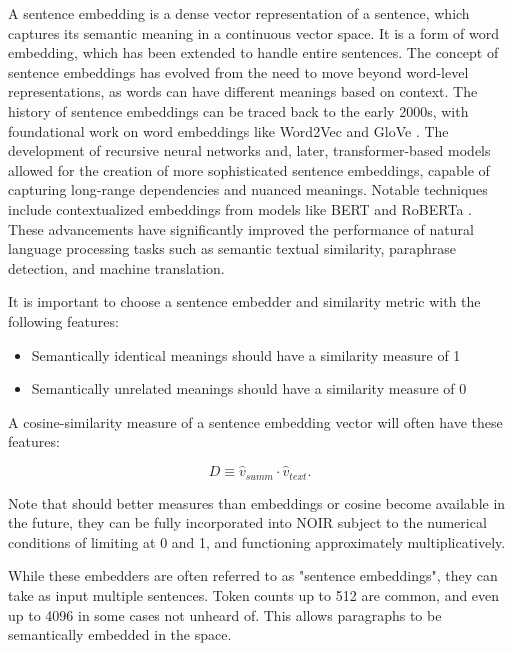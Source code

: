 \documentclass{article}
\begin{document}
A sentence embedding is a dense vector representation of a sentence, which captures its semantic meaning in a continuous vector space. It is a form of word embedding, which has been extended to handle entire sentences. The concept of sentence embeddings has evolved from the need to move beyond word-level representations, as words can have different meanings based on context. The history of sentence embeddings can be traced back to the early 2000s, with foundational work on word embeddings like Word2Vec \citep{mikolov2013efficient} and GloVe \citep{pennington-etal-2014-glove,}. The development of recursive neural networks and, later, transformer-based models allowed for the creation of more sophisticated sentence embeddings, capable of capturing long-range dependencies and nuanced meanings. Notable techniques include contextualized embeddings from models like BERT \citep{DBLP:journals/corr/abs-1810-04805} and RoBERTa \citep{DBLP:journals/corr/abs-1907-11692}. These advancements have significantly improved the performance of natural language processing tasks such as semantic textual similarity, paraphrase detection, and machine translation.

It is important to choose a sentence embedder and similarity metric with the following features: 

\begin{itemize}
	\item Semantically identical meanings should have a similarity measure of 1
	\item Semantically unrelated meanings should have a similarity measure of 0
\end{itemize}

A cosine-similarity measure of a sentence embedding vector will often have these features: 

\begin{equation}
	D \equiv \hat{v}_{summ} \cdot \hat{v}_{text}.
\end{equation}


Note that should better measures than embeddings or cosine become available in the future, they can be fully incorporated into NOIR subject to the numerical conditions of limiting at 0 and 1, and functioning approximately multiplicatively.

While these embedders are often referred to as "sentence embeddings", they can take as input multiple sentences.  Token counts up to 512 are common, and even up to 4096 in some cases not unheard of.  This allows paragraphs to be semantically embedded in the space.
\end{document}
